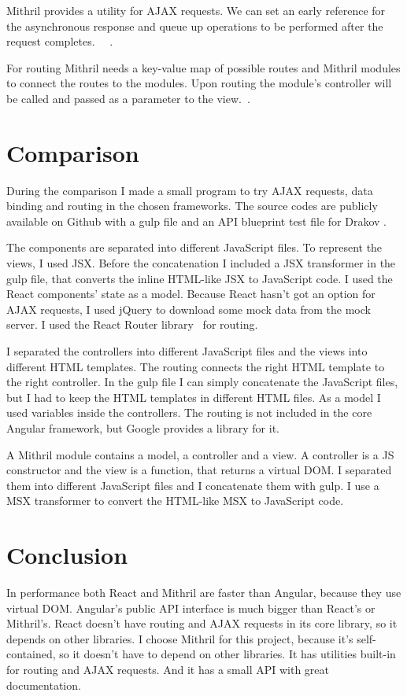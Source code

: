 Mithril provides a utility for AJAX requests. We can set an early reference for the asynchronous response and queue up operations to be performed after the request completes.  ~\cite{Mithril-webservice}~\cite{Mithril-request}.


For routing Mithril needs a key-value map of possible routes and Mithril modules to connect the routes to the modules. Upon routing the module's controller will be called and passed as a parameter to the view.~\cite{Mithril-routing}.

\section{Comparison}

During the comparison I made a small program to try AJAX requests, data binding and routing in the chosen frameworks. The source codes are publicly available on Github with a gulp file  and an API blueprint test file for Drakov .

The components are separated into different JavaScript files. To represent the views, I used JSX. Before the concatenation I included a JSX transformer in the gulp file, that converts the inline HTML-like JSX to JavaScript code. I used the React components' state as a model. Because React hasn't got an option for AJAX requests, I used jQuery to download some mock data from the mock server. I used the React Router library~\cite{React-router} for routing. 


I separated the controllers into different JavaScript files and the views into different HTML templates. The routing connects the right HTML template to the right controller. In the gulp file I can simply concatenate the JavaScript files, but I had to keep the HTML templates in different HTML files. As a model I used variables inside the controllers. The routing is not included in the core Angular framework, but Google provides a library for it.


A Mithril module contains a model, a controller and a view. A controller is a JS constructor and the view is a function, that returns a virtual DOM. I separated them into different JavaScript files and I concatenate them with gulp. I use a MSX transformer to convert the HTML-like MSX to JavaScript code. 

\section{Conclusion}
In performance both React and Mithril are faster than Angular, because they use virtual DOM. Angular's public API interface is much bigger than React's or Mithril's. React doesn't have routing and AJAX requests in its core library, so it depends on other libraries. 
I choose Mithril for this project, because it's  self-contained, so it doesn't have to depend on other libraries. It has utilities built-in for routing and AJAX requests. And it has a small API with great documentation. 



